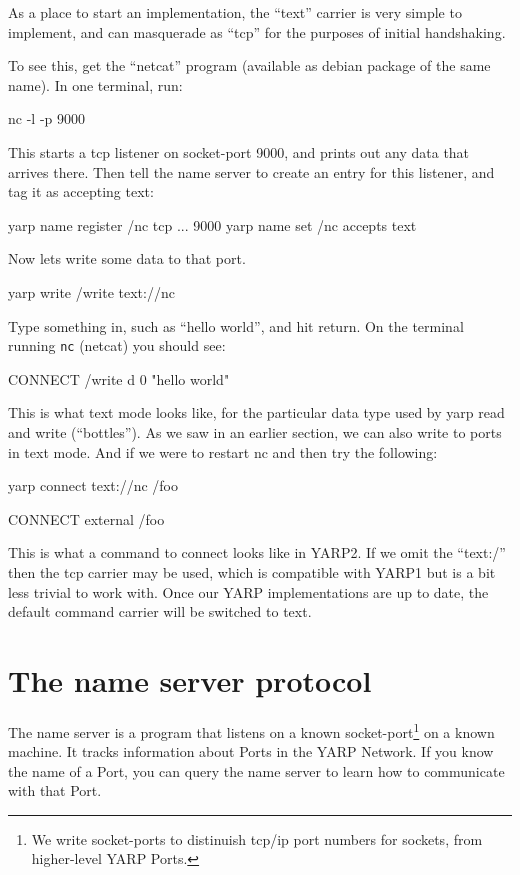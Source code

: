 \documentclass[a4]{article}
\begin{document}
As a place to start an implementation, the ``text'' carrier is very
simple to implement, and can masquerade as ``tcp'' for the purposes
of initial handshaking.

To see this, get the ``netcat'' program (available as debian package
of the same name).  In one terminal, run:
%
\begin{code}
nc -l -p 9000
\end{code}
%
This starts a tcp listener on socket-port 9000, and prints out
any data that arrives there.  Then tell the name server to
create an entry for this listener, and tag it as accepting text:
%
\begin{code}
yarp name register /nc tcp ... 9000
yarp name set /nc accepts text
\end{code}
%
Now lets write some data to that port.
%
\begin{code}
yarp write /write text://nc
\end{code}
%
Type something in, such as ``hello world'', and hit return.
On the terminal running {\tt nc} (netcat) you should see:
%
\begin{code}
CONNECT /write
d
0 "hello world"
\end{code}
%
This is what text mode looks like, for the particular
data type used by yarp read and write (``bottles'').  
As we saw in an earlier section, we can also write to ports in text mode.
And if we were to restart nc and then try the following:
%
\begin{code}
yarp connect text://nc /foo
\end{code}
%
\begin{code}
CONNECT external
/foo
\end{code}
%
This is what a command to connect looks like in YARP2.  If we omit the
``text:/'' then the tcp carrier may be used, which is compatible with YARP1
but is a bit less trivial to work with.  Once our YARP implementations
are up to date, the default command carrier will be switched to text.



\section{The name server protocol}

\label{sect:name-protocol}

The name server is a program that listens on a known socket-port\footnote{We
write socket-ports to distinuish tcp/ip port numbers for sockets, 
from higher-level YARP Ports.}
on a known machine.
%
It tracks information about Ports in the YARP Network.
%
%
If you know the name
of a Port, you can query the name server to learn how to communicate
with that Port.
\end{document}
